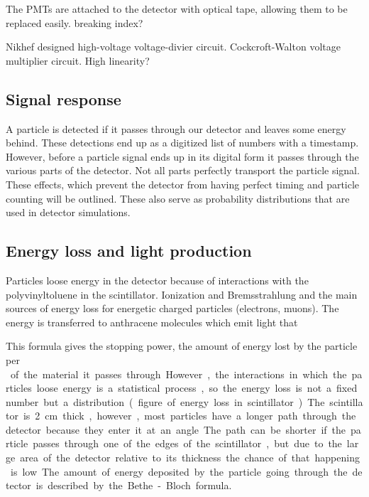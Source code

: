 The PMTs are attached to the detector with optical tape, allowing them to be replaced easily. breaking index?

Nikhef designed high-voltage voltage-divier circuit.
Cockcroft-Walton voltage multiplier circuit.
High linearity?


\subsection{Signal response}

A particle is detected if it passes through our detector and leaves some energy behind. These detections end up as a digitized list of numbers with a timestamp. However, before a particle signal ends up in its digital form it passes through the various parts of the detector. Not all parts perfectly transport the particle signal. These effects, which prevent the detector from having perfect timing and particle counting will be outlined. These also serve as probability distributions that are used in detector simulations.


\subsection{Energy loss and light production}

Particles loose energy in the detector because of interactions with the polyvinyltoluene in the scintillator. Ionization and Bremsstrahlung and the main sources of energy loss for energetic charged particles (electrons, muons). The energy is transferred to anthracene molecules which emit light that

This formula gives the stopping power, the amount of energy lost by the particle per \si{\gram\centi\meter\square} of the material it passes through. However, the interactions in which the particles loose energy is a statistical process, so the energy loss is not a fixed number but a distribution.

(figure of energy loss in scintillator)

The scintillator is \SI{2}{\centi\meter} thick, however, most particles have a longer path through the detector because they enter it at an angle. The path can be shorter if the particle passes through one of the edges of the scintillator, but due to the large area of the detector relative to its thickness the chance of that happening is low. The amount of energy deposited by the particle going through the detector is described by the Bethe-Bloch formula.


